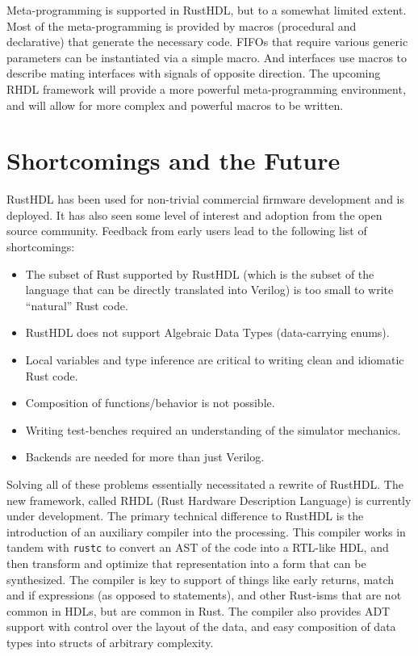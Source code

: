 \documentclass[sigplan,screen,sigconf]{acmart}
\begin{document}
Meta-programming is supported in RustHDL, but to a somewhat limited extent.  Most of the meta-programming 
is provided by macros (procedural and declarative) that generate the necessary code.   FIFOs that require 
various generic parameters can be instantiated via a simple macro.  And interfaces use macros to describe
mating interfaces with signals of opposite direction.  The upcoming RHDL framework will provide a more
powerful meta-programming environment, and will allow for more complex and powerful macros to be written.

\section{Shortcomings and the Future}
RustHDL has been used for non-trivial commercial firmware development and is deployed.  It has also seen 
some level of interest and adoption from the open source community.  Feedback from early users 
lead to the following list of shortcomings:

\begin{itemize}
  \item The subset of Rust supported by RustHDL (which is the subset of the language that can be 
  directly translated into Verilog) is too small to write ``natural'' Rust code. 
  \item RustHDL does not support Algebraic Data Types (data-carrying enums).
  \item Local variables and type inference are critical to writing clean and
  idiomatic Rust code.  
  \item Composition of functions/behavior is not possible. 
  \item Writing test-benches required an understanding of the simulator mechanics.
  \item Backends are needed for more than just Verilog.
\end{itemize}

Solving all of these problems essentially necessitated a rewrite of RustHDL.  The new framework,
called RHDL (Rust Hardware Description Language) is currently under development.  The primary
technical difference to RustHDL is the introduction of an auxiliary compiler into the processing.
This compiler works in tandem with \verb|rustc| to convert an AST of the code into a RTL-like
HDL, and then transform and optimize that representation into a form that can be synthesized.  The 
compiler is key to support of things like early returns, match and if expressions (as opposed to statements),
and other Rust-isms that are not common in HDLs, but are common in Rust.  The compiler also provides
ADT support with control over the layout of the data, and easy composition of data types into structs
of arbitrary complexity.  
\end{document}
